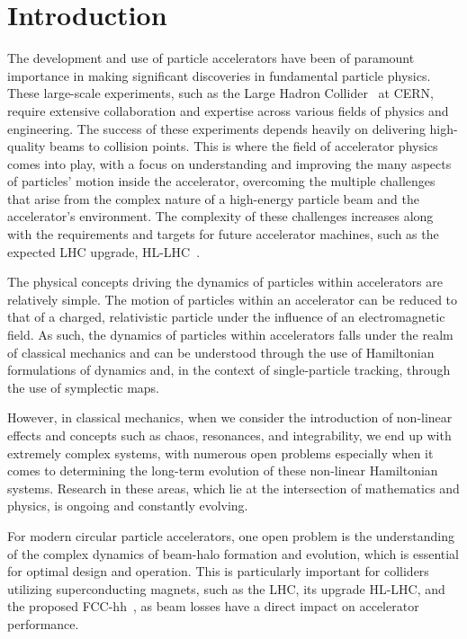 


\chapter*{Introduction}

The development and use of particle accelerators have been of paramount importance in making significant discoveries in fundamental particle physics. These large-scale experiments, such as the Large Hadron Collider~\cite{Bruning:782076} at CERN, require extensive collaboration and expertise across various fields of physics and engineering. The success of these experiments depends heavily on delivering high-quality beams to collision points. This is where the field of accelerator physics comes into play, with a focus on understanding and improving the many aspects of particles' motion inside the accelerator, overcoming the multiple challenges that arise from the complex nature of a high-energy particle beam and the accelerator's environment. The complexity of these challenges increases along with the requirements and targets for future accelerator machines, such as the expected LHC upgrade, HL-LHC~\cite{BejarAlonso:2749422, Arduini_2016}.

The physical concepts driving the dynamics of particles within accelerators are relatively simple. The motion of particles within an accelerator can be reduced to that of a charged, relativistic particle under the influence of an electromagnetic field. As such, the dynamics of particles within accelerators falls under the realm of classical mechanics and can be understood through the use of Hamiltonian formulations of dynamics and, in the context of single-particle tracking, through the use of symplectic maps.

However, in classical mechanics, when we consider the introduction of non-linear effects and concepts such as chaos, resonances, and integrability, we end up with extremely complex systems, with numerous open problems especially when it comes to determining the long-term evolution of these non-linear Hamiltonian systems. Research in these areas, which lie at the intersection of mathematics and physics, is ongoing and constantly evolving.

For modern circular particle accelerators, one open problem is the understanding of the complex dynamics of beam-halo formation and evolution, which is essential for optimal design and operation. This is particularly important for colliders utilizing superconducting magnets, such as the LHC, its upgrade HL-LHC, and the proposed FCC-hh~\cite{Benedikt:2651300}, as beam losses have a direct impact on accelerator performance.

